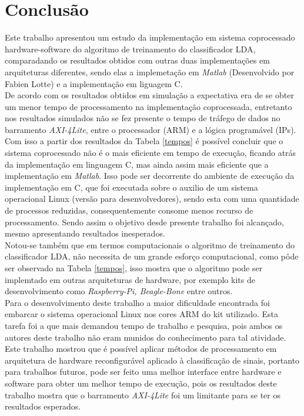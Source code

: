 \chapter[Conclusao]{Conclusão}

Este trabalho apresentou um estudo da implementação em sistema coprocessado hardware-software do algoritmo de treinamento do classificador LDA, comparadando os resultados obtidos com outras duas implementações em arquiteturas diferentes, sendo elas a implemetação em \textit{Matlab} (Desenvolvido por Fabien Lotte) e a implementação em liguagem C.\\

De acordo com os resultados obtidos em simulação a expectativa era de se obter um menor tempo de processamento na implementação coprocessada, entretanto nos resultados simulados não se fez presente o tempo de tráfego de dados no barramento \textit{AXI-4Lite}, entre o processador (ARM) e a lógica programável (IPs). Com isso a partir dos resultados da Tabela \ref{tempos} é possível concluir que o sistema coprocessado não é o mais eficiente em tempo de execução, ficando atrás da implementação em linguagem C, mas ainda assim mais eficiente que a implementação em \textit{Matlab}. Isso pode ser decorrente do ambiente de execução da implementação em C, que foi executada sobre o auxilio de um sistema operacional Linux (versão para desenvolvedores), sendo esta com uma quantidade de processos reduzidas, consequentemente consome menos recurso de processamento. Sendo assim o objetivo desde presente trabalho foi
alcançado, mesmo apresentando resultados inesperados.\\

Notou-se também que em termos computacionais o algoritmo de treinamento do classificador LDA, não necessita de um grande esforço computacional, como pôde ser observado na Tabela \ref{tempos}, isso mostra que o algoritmo pode ser implemtado em outras arquiteturas de hardware, por exemplo kits de desenvolvimento como \textit{Raspberry-Pi, Beagle-Bone} entre outros.\\

Para o desenvolvimento deste trabalho a maior dificuldade encontrada foi embarcar o sistema operacional Linux nos cores ARM do kit utilizado. Esta tarefa foi a que mais demandou tempo de trabalho e pesquisa, pois ambos os autores deste trabalho não eram munidos do conhecimento para tal atividade. \\

Este trabalho mostrou que é possível aplicar métodos de processamento em arquitetura de hardware reconfigurável aplicado à classificação de sinais, portanto para trabalhos futuros, pode ser feito uma melhor interface entre hardware e software para obter um melhor tempo de execução, pois os resultados deste trabalho mostra que o barramento \textit{AXI-4Lite} foi um limitante para se ter os resultados esperados. 
